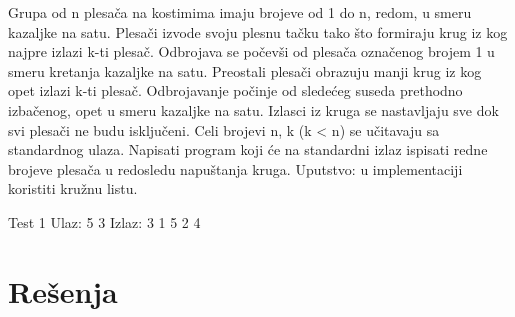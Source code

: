 \begin{Exercise}[label=611]
Grupa od n plesača na kostimima imaju brojeve od 1 do n, redom, u smeru kazaljke na satu.
Plesači izvode svoju plesnu tačku tako što formiraju krug iz kog najpre izlazi k-ti plesač.
Odbrojava se počevši od plesača označenog brojem 1 u smeru kretanja kazaljke na satu. 
Preostali plesači obrazuju manji krug iz kog opet izlazi k-ti plesač. Odbrojavanje počinje od
sledećeg suseda prethodno izbačenog, opet u smeru kazaljke na satu. Izlasci iz kruga se nastavljaju
sve dok svi plesači ne budu isključeni. 
Celi brojevi n, k (k < n) se učitavaju sa standardnog ulaza. Napisati program koji će na standardni 
izlaz ispisati redne brojeve plesača u redosledu napuštanja kruga. 
Uputstvo: u implementaciji koristiti kružnu listu.
\begin{maxitest}
  \begin{test}{Test 1}
Ulaz: 5 3 
Izlaz: 3 1 5 2 4
  \end{test}
\end{maxitest}

\end{Exercise}
\begin{Answer}[ref=611]
\end{Answer}


\section{Rešenja}
\shipoutAnswer


